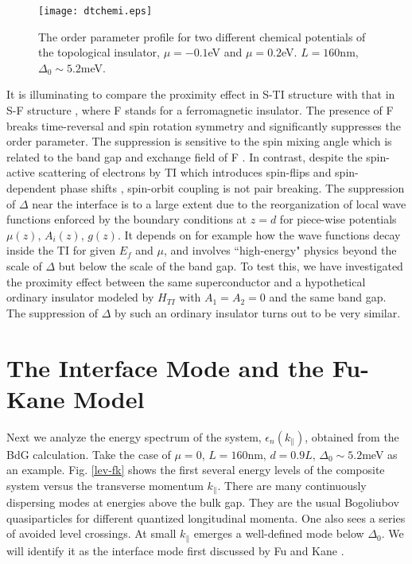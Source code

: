 \documentclass[11pt,revtex,aps]{report}
\begin{document}
\begin{figure}
\center
\texttt{[image: dtchemi.eps]}
\caption{The order parameter profile for two different chemical potentials of
the topological insulator, $\mu=-0.1$eV and $\mu=0.2$eV. $L=160$nm,  
$\Delta_0\sim 5.2$meV. }\label{delta-chem}
\end{figure}

It is illuminating to compare the proximity effect in S-TI
structure with that in S-F structure \cite{toku}, where F stands for 
a ferromagnetic insulator. 
The presence of F breaks time-reversal and spin rotation symmetry and 
significantly suppresses the order parameter. The suppression is
sensitive to the spin mixing angle which is related to the band gap
and exchange field of F \cite{toku}.
In contrast, despite the spin-active scattering of electrons 
by TI which introduces spin-flips and spin-dependent phase shifts \cite{zhao}, 
spin-orbit coupling is not pair breaking.
%
The suppression of $\Delta$ near the interface is to a large extent 
due to the reorganization of local wave functions enforced by the boundary conditions 
at $z=d$ for piece-wise potentials $\mu(z)$, $A_i(z)$, $g(z)$. 
It depends on for example how the wave functions decay inside the TI
for given $E_f$ and $\mu$, and involves ``high-energy" physics beyond the
scale of $\Delta$ but below the scale of the band gap. 
%
To test this, we have investigated the proximity effect between the same
superconductor and
a hypothetical ordinary insulator modeled by $H_{TI}$ with $A_1=A_2=0$
and the same band gap. The suppression of $\Delta$ by such an 
ordinary insulator turns out to be very similar. 

\section{The Interface Mode and the Fu-Kane Model}

Next we analyze the energy spectrum of the system, $\epsilon_n(k_\parallel)$,
obtained from the BdG calculation. 
Take the case of $\mu=0$, $L=160$nm, $d=0.9L$, $\Delta_0\sim 5.2$meV as an example.
Fig. \ref{lev-fk} shows the first several energy levels of the composite
system versus the transverse momentum $k_\parallel$. There are many continuously
dispersing modes at energies above the bulk gap. They are the usual Bogoliubov
quasiparticles for different quantized longitudinal momenta.
One also sees a series of avoided level crossings.
At small $k_\parallel$ emerges a well-defined mode below $\Delta_0$. We will 
identify it as the interface mode first discussed by Fu and Kane \cite{f-k}.
\end{document}
